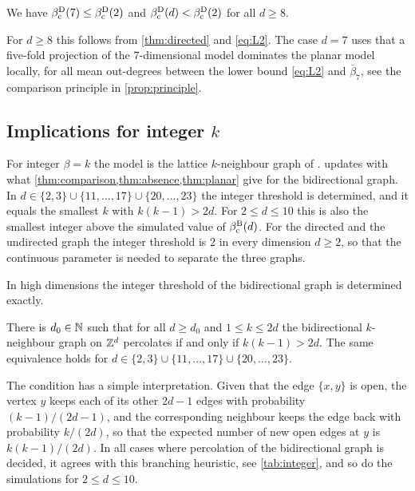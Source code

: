 \documentclass[11pt,letterpaper]{article}
\begin{document}
\begin{theorem}\label{thm:plane}
We have $\beta_{\mathrm c}^{\mathrm D}(7)\le\beta_{\mathrm c}^{\mathrm D}(2)$ and $\beta_{\mathrm c}^{\mathrm D}(d)<\beta_{\mathrm c}^{\mathrm D}(2)$ for all $d\ge8$.
\end{theorem}

For $d\ge8$ this follows from \cref{thm:directed} and \eqref{eq:L2}. The case $d=7$ uses that a five-fold projection of the $7$-dimensional model dominates the planar model locally, for all mean out-degrees between the lower bound \eqref{eq:L2} and $\bar\beta_7$, see the comparison principle in \cref{prop:principle}.

\subsection{Implications for integer \texorpdfstring{$k$}{k}}

For integer $\beta=k$ the model is the lattice $k$-neighbour graph of \cite{JKLT25}.  updates \cite[Table~1]{BJKLRT25} with what \cref{thm:comparison,thm:absence,thm:planar} give for the bidirectional graph. In $d\in\{2,3\}\cup\{11,\dots,17\}\cup\{20,\dots,23\}$ the integer threshold is determined, and it equals the smallest $k$ with $k(k-1)>2d$. For $2\le d\le10$ this is also the smallest integer above the simulated value of $\beta_{\mathrm c}^{\mathrm B}(d)$. For the directed and the undirected graph the integer threshold is $2$ in every dimension $d\ge2$, so that the continuous parameter is needed to separate the three graphs.



In high dimensions the integer threshold of the bidirectional graph is determined exactly.

\begin{corollary}\label{cor:integer}
There is $d_0\in\mathbb N$ such that for all $d\ge d_0$ and $1\le k\le2d$ the bidirectional $k$-neighbour graph on $\mathbb Z^d$ percolates if and only if $k(k-1)>2d$. The same equivalence holds for $d\in\{2,3\}\cup\{11,\dots,17\}\cup\{20,\dots,23\}$.
\end{corollary}

The condition has a simple interpretation. Given that the edge $\{x,y\}$ is open, the vertex $y$ keeps each of its other $2d-1$ edges with probability $(k-1)/(2d-1)$, and the corresponding neighbour keeps the edge back with probability $k/(2d)$, so that the expected number of new open edges at $y$ is $k(k-1)/(2d)$. In all cases where percolation of the bidirectional graph is decided, it agrees with this branching heuristic, see \cref{tab:integer}, and so do the simulations for $2\le d\le10$.
\end{document}
